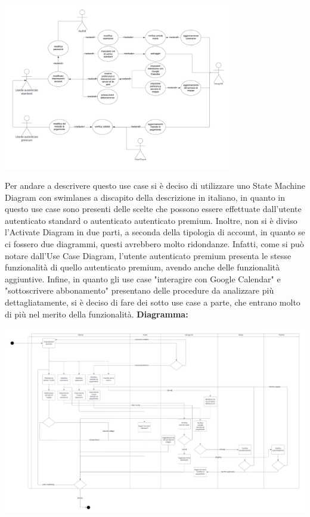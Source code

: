 \begin{listaPersonale}[UC]{}
    \begin{center}
        \includegraphics[width=0.75\textwidth, height = 0.35\textheight]{img/Diagrammi/UseCases/ImpostazioniAccount.png}
    \end{center}
    Per andare a descrivere questo use case si è deciso di utilizzare uno State Machine Diagram con swimlanes a discapito della descrizione in italiano, in quanto in questo use case sono presenti delle scelte che possono essere effettuate dall'utente autenticato standard o autenticato autenticato premium. Inoltre, non si è diviso l'Activate Diagram in due parti, a seconda della tipologia di account, in quanto se ci fossero due diagrammi, questi avrebbero molto ridondanze. Infatti, come si può notare dall'Use Case Diagram, l'utente autenticato premium presenta le stesse funzionalità di quello autenticato premium, avendo anche delle funzionalità aggiuntive.
    Infine, in quanto gli use case "interagire con Google Calendar" e "sottoscrivere abbonamento" presentano delle procedure da analizzare più dettagliatamente, si è deciso di fare dei sotto use case a parte, che entrano molto di più nel merito della funzionalità.
    \newpage
    \textbf{Diagramma:}
    \begin{center}
        \includegraphics[width=1.1\textwidth]{img/Diagrammi/DS/DS_ImpostazioneAccount.png}
    \end{center}
    \begin{listaPersonale2}[UC] {}


\end{listaPersonale2}
\end{listaPersonale}
